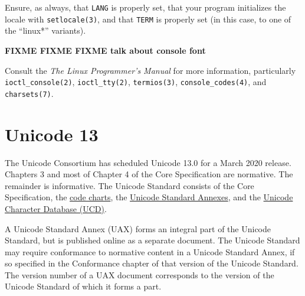 \documentclass[letterpaper,10pt]{article}
\begin{document}
\begin{appendices}
Ensure, as always, that \texttt{LANG} is properly set, that your program
initializes the locale with \texttt{setlocale(3)}, and that \texttt{TERM} is
properly set (in this case, to one of the ``linux*'' variants).

\textbf{FIXME FIXME FIXME talk about console font}

Consult the \textit{The Linux Programmer's Manual} for more information,
particularly
\texttt{ioctl\_console(2)}\cite{ioctlconsole},
\texttt{ioctl\_tty(2)}\cite{ioctltty},
\texttt{termios(3)}\cite{termios},
\texttt{console\_codes(4)}\cite{consolecodes},
and
\texttt{charsets(7)}\cite{charsets7}.

\cleardoublepage
\section{Unicode 13}
The Unicode Consortium has scheduled Unicode 13.0 for a March 2020 release.
Chapters 3 and most of Chapter 4 of the Core Specification are normative. The
remainder is informative. The Unicode Standard consists of the Core
Specification\cite{unicode13}, the \href{https://www.unicode.org/charts/}{code charts},
the \href{https://unicode.org/versions/Unicode13.0.0/#Unicode_Standard_Annexes_nb}{Unicode Standard Annexes},
and the \href{http://www.unicode.org/Public/13.0.0/}{Unicode Character Database (UCD)}.

A Unicode Standard Annex (UAX) forms an integral part of the Unicode Standard,
but is published online as a separate document. The Unicode Standard may
require conformance to normative content in a Unicode Standard Annex, if so
specified in the Conformance chapter of that version of the Unicode Standard.
The version number of a UAX document corresponds to the version of the Unicode
Standard of which it forms a part.


\end{appendices}
\end{document}

